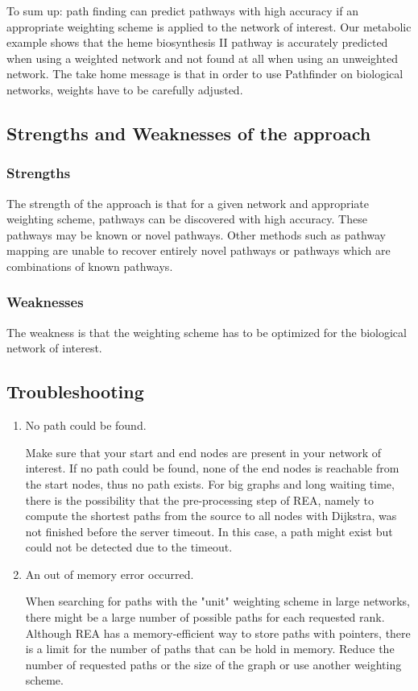 To sum up: path finding can predict pathways with high accuracy if an appropriate weighting scheme is applied to the network of interest. Our metabolic example shows that the heme biosynthesis II pathway is accurately predicted when using a weighted network and not found at all when using an unweighted network. The take home message is that in order to use Pathfinder on biological networks, weights have to be carefully adjusted.

\subsection{Strengths and Weaknesses of the approach}

\subsubsection{Strengths}
The strength of the approach is that for a given network and appropriate weighting scheme, pathways can be discovered with high accuracy. These pathways may be known or novel pathways. Other methods such as pathway mapping
are unable to recover entirely novel pathways or pathways which are combinations of known pathways.

\subsubsection{Weaknesses}
The weakness is that the weighting scheme has to be optimized for the biological network of interest.

\subsection{Troubleshooting}

\begin{enumerate}

\item No path could be found.

 Make sure that your start and end nodes are present in your network of interest. If no path could be found, none
 of the end nodes is reachable from the start nodes, thus no path exists. For big graphs and long waiting time, there is the possibility that
 the pre-processing step of REA, namely to compute the shortest paths from the source to all nodes with Dijkstra, was not finished before
 the server timeout. In this case, a path might exist but could not be detected due to the timeout.

\item An out of memory error occurred.

 When searching for paths with the "unit" weighting scheme in large networks, there might be
 a large number of possible paths for each requested rank.  Although REA has a memory-efficient
 way to store paths with pointers, there is a limit for the number of paths that can be hold in memory.
 Reduce the number of requested paths or the size of the graph or use another weighting scheme.

\end{enumerate}







